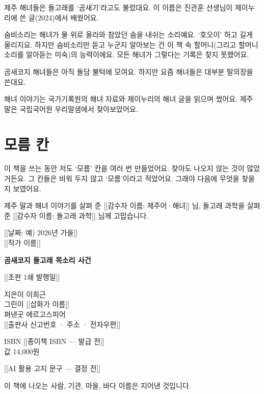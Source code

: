 \documentclass[
  korean,
  letterpaper,
  twoside,
  open=any,
  fontsize=12.5pt,
  headings=small]{scrbook}
\newcommand{\colophonstart}{\clearpage\thispagestyle{empty}\vspace*{\fill}\begingroup\small\setlength{\parindent}{0pt}\setlength{\parskip}{0.5em}\linespread{1.3}\selectfont}
\newcommand{\colophonend}{\par\endgroup}
\begin{document}

제주 해녀들은 돌고래를
`곰새기'라고도 불렀대요. 이
이름은 진관훈 선생님이
제이누리에 쓴 글(2024)에서
배웠어요.

숨비소리는 해녀가 물 위로
올라와 참았던 숨을 내쉬는
소리예요. `호오이' 하고 길게
울리지요. 하지만 숨비소리만
듣고 누군지 알아보는 건 이 책
속 할머니(그리고 할머니 소리를
알아듣는 미숙)의 능력이에요.
모든 해녀가 그렇다는 기록은
찾지 못했어요.

곰새코지 해녀들은 아직 돌담
불턱에 모여요. 하지만 요즘
해녀들은 대부분 탈의장을
쓴대요.

해녀 이야기는 국가기록원의
해녀 자료와 제이누리의 해녀
글을 읽으며 썼어요. 제주 말은
국립국어원 우리말샘에서
찾아보았어요.

\section*{모름
칸}\label{uxbaa8uxb984-uxce78}


이 책을 쓰는 동안 저도 `모름'
칸을 여러 번 만들었어요.
찾아도 나오지 않는 것이
많았거든요. 그 칸들은 비워
두지 않고 `모름'이라고
적었어요. 그래야 다음에 무엇을
찾을지 보였어요.

제주 말과 해녀 이야기를 살펴
준 {[}{[}감수자 이름:
제주어·해녀{]}{]} 님, 돌고래
과학을 살펴 준 {[}{[}감수자
이름: 돌고래 과학{]}{]} 님께
고맙습니다.

{[}{[}날짜: 예) 2026년
가을{]}{]}\\
{[}{[}작가 이름{]}{]}

\colophonstart

\textbf{곰새코지 돌고래 목소리
사건}

{[}{[}초판 1쇄 발행일{]}{]}

지은이 이희근\\
그린이 {[}{[}삽화가
이름{]}{]}\\
펴낸곳 에르고스피어\\
{[}{[}출판사 신고번호 · 주소 ·
전자우편{]}{]}

ISBN {[}{[}종이책 ISBN ---
발급 전{]}{]}\\
값 \mbox{14,000원}

{[}{[}AI 활용 고지 문구 ---
결정 전{]}{]}

이 책에 나오는 사람, 기관,
마을, 바다 이름은 지어낸
것입니다.

\colophonend


\backmatter
\end{document}
